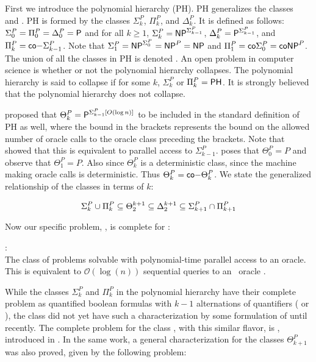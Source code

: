 First we introduce the polynomial hierarchy (PH).
PH generalizes the classes \np~ and .
PH is formed by the classes $\Sigma_k^P$, $\Pi_k^P$, and $\Delta_k^P$.
It is defined as follows: $\Sigma_0^P = \Pi_0^P = \Delta_0^P = \mathsf{P}$ and
for all $k \geq 1$,
$\Sigma_k^P = \mathsf{NP}^{\Sigma_{k-1}^P}$,
$\Delta_k^P = \mathsf{P}^{\Sigma_{k-1}^P}$, and
$\Pi_k^P = \mathsf{co-}\Sigma_{k-1}^P$.
Note that
$\Sigma_1^P = \mathsf{NP}^{\Sigma_{0}^P} = \mathsf{NP}^{P} = \mathsf{NP}$
and $\Pi_1^P = \mathsf{co}{\Sigma_{0}^P} = \mathsf{coNP}^{P}$.
The union of all the classes in PH is denoted .
An open problem in computer science is whether or not
the polynomial hierarchy collapses.
The polynomial hierarchy is said to collapse if for some $k$, $\Sigma_k^P$ or $\Pi_k^P = \mathsf{PH}$.
It is strongly believed that the
polynomial hierarchy does not collapse.

\citet{PZ83} proposed that $\Theta_{k}^P = \mathsf{P}^{\Sigma_{k-1}^P
[O(\log n)]}$ to be included in the standard definition of PH as well,
where the bound in the brackets represents the bound on the allowed
number of oracle calls to the oracle class preceding the brackets.
Note that \citet{hem87} showed that this is equivalent to parallel
access to $\Sigma_{k-1}^P$.
\citet{compsat} poses that $\Theta_0^P = P$ and observe that
$\Theta_1^P = P$.
Also since $\Theta_{k}^P$ is a deterministic class, since the
machine making oracle calls is deterministic.
Thus $\Theta_{k}^P = \mathsf{co-}\Theta_{k}^P$.
We state the generalized relationship of the classes in terms of
$k$:

$$\Sigma^{P}_{k} \cup \Pi^{P}_{k} \subseteq
    \Theta^{k+1}_2 \subseteq \Delta^{k+1}_2
    \subseteq \Sigma^{P}_{k+1} \cap \Pi^{P}_{k+1}$$

Now our specific problem, \dwin, is complete for \tp:

\begin{defn}{\tp:} \\
    The class of problems solvable with polynomial-time parallel access to an
    \np oracle.
    This is equivalent to $\mathcal{O}(\log(n))$ sequential queries to an
\np~oracle \citep{hem87, ksw87}.
\end{defn}

While the classes $\Sigma^P_k$ and $\Pi^P_k$ in the polynomial hierarchy
have their complete problem as quantified boolean formulas with $k-1$
alternations of quantifiers ( or ),
the class \tp did not yet have such a characterization by some formulation
of  until recently.
The complete problem for the class \tp, with this similar flavor, is
\csat, introduced in \citet{csatintro}.
In the same work, a general characterization for the classes
$\Theta_{k+1}^P$ was also proved, given by the following problem:


